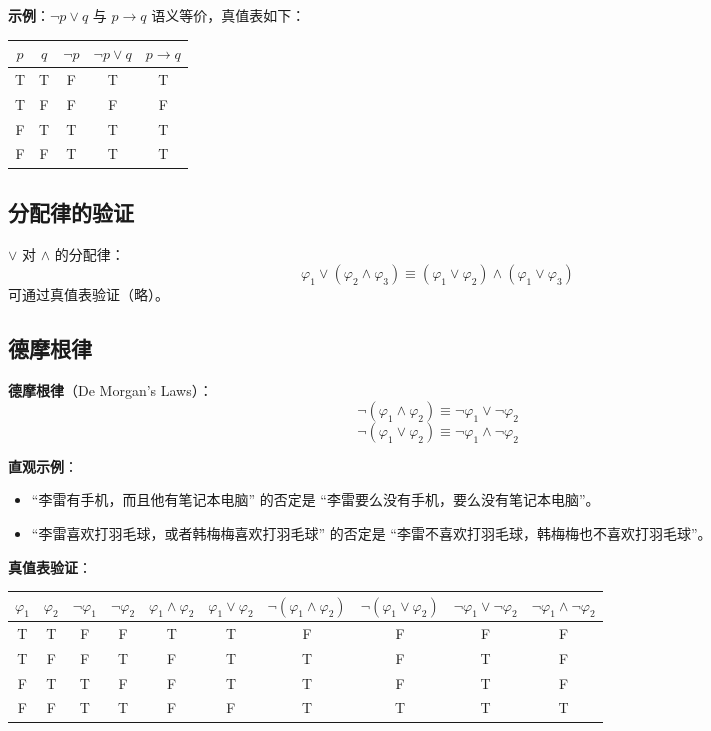 \documentclass[UTF8,11pt,a4paper]{ctexbook}   %
\theoremstyle{definition}
\begin{document}
\textbf{示例}：$\neg p \lor q$ 与 $p \to q$ 语义等价，真值表如下：

\begin{table}[htbp]
\centering
\begin{tabular}{|c|c|c|c|c|}
\hline
$p$ & $q$ & $\neg p$ & $\neg p \lor q$ & $p \to q$ \\
\hline
T & T & F & T & T \\
T & F & F & F & F \\
F & T & T & T & T \\
F & F & T & T & T \\
\hline
\end{tabular}
\end{table}

\subsection{分配律的验证}

$\lor$ 对 $\land$ 的分配律：
\[
\varphi_1 \lor (\varphi_2 \land \varphi_3) \equiv (\varphi_1 \lor \varphi_2) \land (\varphi_1 \lor \varphi_3)
\]
可通过真值表验证（略）。

\subsection{德摩根律}

\textbf{德摩根律}（De Morgan's Laws）：
\[
\neg(\varphi_1 \land \varphi_2) \equiv \neg\varphi_1 \lor \neg\varphi_2
\]
\[
\neg(\varphi_1 \lor \varphi_2) \equiv \neg\varphi_1 \land \neg\varphi_2
\]

\textbf{直观示例}：
\begin{itemize}
    \item ``李雷有手机，而且他有笔记本电脑'' 的否定是 ``李雷要么没有手机，要么没有笔记本电脑''。
    \item ``李雷喜欢打羽毛球，或者韩梅梅喜欢打羽毛球'' 的否定是 ``李雷不喜欢打羽毛球，韩梅梅也不喜欢打羽毛球''。
\end{itemize}

\textbf{真值表验证}：

\begin{table}[htbp]
\centering
\small
\begin{tabular}{|c|c|c|c|c|c|c|c|c|c|}
\hline
$\varphi_1$ & $\varphi_2$ & $\neg\varphi_1$ & $\neg\varphi_2$ & $\varphi_1 \land \varphi_2$ & $\varphi_1 \lor \varphi_2$ & $\neg(\varphi_1 \land \varphi_2)$ & $\neg(\varphi_1 \lor \varphi_2)$ & $\neg\varphi_1 \lor \neg\varphi_2$ & $\neg\varphi_1 \land \neg\varphi_2$ \\
\hline
T & T & F & F & T & T & F & F & F & F \\
T & F & F & T & F & T & T & F & T & F \\
F & T & T & F & F & T & T & F & T & F \\
F & F & T & T & F & F & T & T & T & T \\
\hline
\end{tabular}
\end{table}
\end{document}
